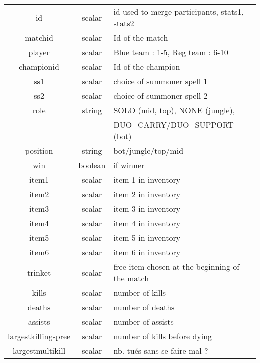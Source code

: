 \begin{longtable}{|c|c|l|}
        \hline
        id                          & scalar          & id used to merge participants, stats1, stats2 \\
        matchid                     & scalar          & Id of the match \\
        player                      & scalar          & Blue team : 1-5, Reg team : 6-10 \\
        championid                  & scalar          & Id of the champion \\
        ss1                         & scalar          & choice of summoner spell 1 \\   
        ss2                         & scalar          & choice of summoner spell 2\\
        role                        & string          & SOLO (mid, top), NONE (jungle),\\ 
        & & DUO\_CARRY/DUO\_SUPPORT (bot)\\
        position                    & string          & bot/jungle/top/mid\\
        win                         & boolean         & if winner \\
        item1                       & scalar          & item 1 in inventory\\
        item2                       & scalar          & item 2 in inventory\\
        item3                       & scalar          & item 3 in inventory\\
        item4                       & scalar          & item 4 in inventory\\
        item5                       & scalar          & item 5 in inventory\\
        item6                       & scalar          & item 6 in inventory\\
        trinket                     & scalar          & free item chosen at the beginning of the match \\
        kills                       & scalar          & number of kills \\
        deaths                      & scalar          & number of deaths \\
        assists                     & scalar          & number of assists \\
        largestkillingspree         & scalar          & number of kills before dying\\
        largestmultikill            & scalar          & nb. tués sans se faire mal ? \\

\end{longtable}

